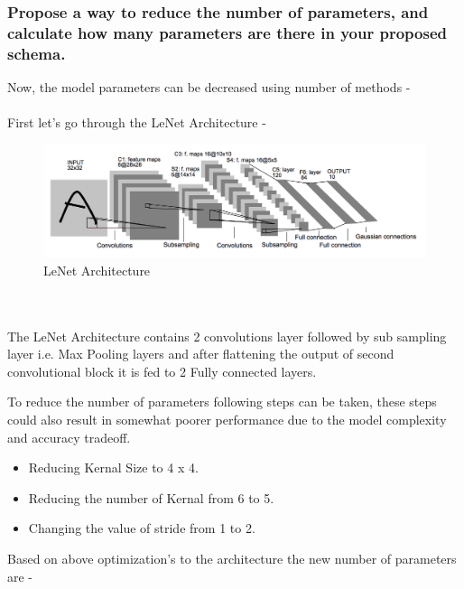 \subsubsection{Propose a way to reduce the number of parameters, and calculate how many parameters are there in your proposed schema.}

Now, the model parameters can be decreased using number of methods -
\\ \\ 
First let's go through the LeNet Architecture -


\begin{figure}[h]
\includegraphics[width=16cm]{2.png}
\centering
\caption{LeNet Architecture}
\end{figure}

\\ \\ 

The LeNet Architecture contains 2 convolutions layer followed by sub sampling layer i.e. Max Pooling layers and after flattening the output of second convolutional block it is fed to 2 Fully connected layers. 

To reduce the number of parameters following steps can be taken, these steps could also result in somewhat poorer performance due to the model complexity and accuracy tradeoff.

\begin{itemize}
    \item Reducing Kernal Size to 4 x 4.
    \item Reducing the number of Kernal from 6 to 5. 
    \item Changing the value of stride from 1 to 2. 
\end{itemize}

Based on above optimization's to the architecture the new number of parameters are - 

